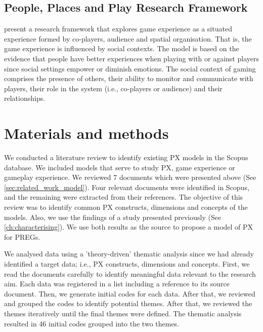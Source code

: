 \subsection{People, Places and Play Research Framework}
\textcite{DeKort2007b} present a research framework that explores game experience as a situated experience formed by co-players, audience and spatial organisation. That is, the game experience is influenced by social contexts. The model is based on the evidence that people have better experiences when playing with or against players since social settings empower or diminish emotions. The social context of gaming comprises the presence of others, their ability to monitor and communicate with players, their role in the system (i.e., co-players or audience) and their relationships.


\section{Materials and methods} %
\label{sec:mats_mets_model}
We conducted a literature review to identify existing \ac{PX} models in the Scopus database. We included models that serve to study \ac{PX}, game experience or gameplay experience. We reviewed 7 documents which were presented above (See \autoref{sec:related_work_model}). Four relevant documents were identified in Scopus, and the remaining were extracted from their references. The objective of this review was to identify common \ac{PX} constructs, dimensions and concepts of the models. Also, we use the findings of a study presented previously (See \autoref{ch:characterising}). We use both results as the source to propose a model of \ac{PX} for \acp{PREG}.

We analysed data using a 'theory-driven' thematic analysis \autocite{Braun} since we had already identified a target data; i.e., \ac{PX} constructs, dimensions and concepts. First, we read the documents carefully to identify meaningful data relevant to the research aim. Each data was registered in a list including a reference to its source document. Then, we generate initial codes for each data. After that, we reviewed and grouped the codes to identify potential themes. After that, we reviewed the themes iteratively until the final themes were defined. The thematic analysis resulted in 46 initial codes grouped into the two themes.

